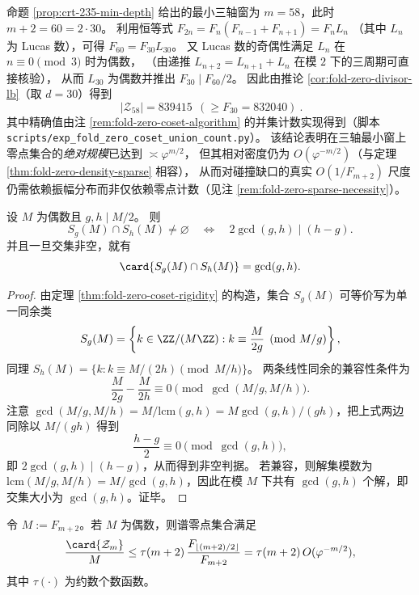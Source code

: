 \begin{remark}[三轴窗上的零点增量：\texorpdfstring{$m=58$}{m=58} 给出 \texorpdfstring{$|\mathcal{Z}_{58}|=839415$}{|Z58|=839415}]\label{rem:fold-zero-lb-m58}
命题 \ref{prop:crt-235-min-depth} 给出的最小三轴窗为 \(m=58\)，此时 \(m+2=60=2\cdot 30\)。
利用恒等式
\(
F_{2n}=F_n(F_{n-1}+F_{n+1})
=F_nL_n
\)
（其中 \(L_n\) 为 Lucas 数），可得
\(
F_{60}=F_{30}L_{30}
\)。
又 Lucas 数的奇偶性满足 \(L_n\) 在 \(n\equiv 0\pmod 3\) 时为偶数，
（由递推 \(L_{n+2}=L_{n+1}+L_n\) 在模 \(2\) 下的三周期可直接核验），
从而 \(L_{30}\) 为偶数并推出
\(
F_{30}\mid F_{60}/2
\)。
因此由推论 \ref{cor:fold-zero-divisor-lb}（取 \(d=30\)）得到
\[
\boxed{\ |\mathcal{Z}_{58}|=839415\ \ (\ge F_{30}=832040)\ }.
\]
其中精确值由注 \ref{rem:fold-zero-coset-algorithm} 的并集计数实现得到（脚本 \texttt{scripts/exp\_fold\_zero\_coset\_union\_count.py}）。
该结论表明在三轴最小窗上零点集合的\emph{绝对规模}已达到 \( \asymp \varphi^{m/2}\)，
但其相对密度仍为 \(O(\varphi^{-m/2})\)（与定理 \ref{thm:fold-zero-density-sparse} 相容），
从而对碰撞缺口的真实 \(O(1/F_{m+2})\) 尺度仍需依赖振幅分布而非仅依赖零点计数（见注 \ref{rem:fold-zero-sparse-necessity}）。
\end{remark}

\begin{lemma}[余类交集判据与交集大小]\label{lem:fold-zero-coset-intersection}
设 \(M\) 为偶数且 \(g,h\mid M/2\)。
则
\[
S_g(M)\cap S_h(M)\neq\varnothing
\quad\Longleftrightarrow\quad
2\gcd(g,h)\mid (h-g).
\]
并且一旦交集非空，就有
\[
\card{S_g(M)\cap S_h(M)}=\gcd(g,h).
\]
\end{lemma}

\begin{proof}
由定理 \ref{thm:fold-zero-coset-rigidity} 的构造，集合 \(S_g(M)\) 可等价写为单一同余类
\[
S_g(M)=\left\{k\in\ZZ/(M\ZZ): k\equiv \frac{M}{2g}\pmod{M/g}\right\},
\]
同理
\(
S_h(M)=\{k: k\equiv M/(2h)\pmod{M/h}\}
\)。
两条线性同余的兼容性条件为
\[
\frac{M}{2g}-\frac{M}{2h}\equiv 0\pmod{\gcd(M/g,M/h)}.
\]
注意 \(\gcd(M/g,M/h)=M/\mathrm{lcm}(g,h)=M\gcd(g,h)/(gh)\)，把上式两边同除以 \(M/(gh)\) 得到
\[
\frac{h-g}{2}\equiv 0\pmod{\gcd(g,h)},
\]
即 \(2\gcd(g,h)\mid(h-g)\)，从而得到非空判据。
若兼容，则解集模数为 \(\mathrm{lcm}(M/g,M/h)=M/\gcd(g,h)\)，因此在模 \(M\) 下共有 \(\gcd(g,h)\) 个解，即交集大小为 \(\gcd(g,h)\)。证毕。
\end{proof}

\begin{theorem}[谱零点密度的指数稀疏上界]\label{thm:fold-zero-density-sparse}
令 \(M:=F_{m+2}\)。若 \(M\) 为偶数，则谱零点集合满足
\[
\frac{\card{\mathcal{Z}_m}}{M}
\le
\tau(m+2)\,\frac{F_{\lfloor (m+2)/2\rfloor}}{F_{m+2}}
=\tau(m+2)\,O(\varphi^{-m/2}),
\]
其中 \(\tau(\cdot)\) 为约数个数函数。
\end{theorem}

